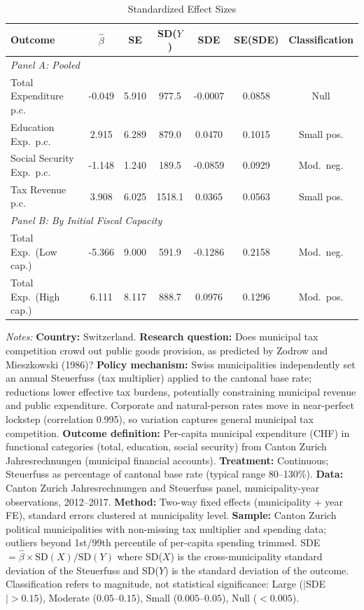 \begin{table}[htbp]
\centering
\caption{Standardized Effect Sizes}
\label{tab:sde}
\begin{tabular}{lcccccc}
\hline\hline
Outcome & $\hat{\beta}$ & SE & SD($Y$) & SDE & SE(SDE) & Classification \\
\hline
\multicolumn{7}{l}{\textit{Panel A: Pooled}} \\
Total Expenditure p.c. & -0.049 & 5.910 & 977.5 & -0.0007 & 0.0858 & Null \\
Education Exp.\ p.c. & 2.915 & 6.289 & 879.0 & 0.0470 & 0.1015 & Small pos. \\
Social Security Exp.\ p.c. & -1.148 & 1.240 & 189.5 & -0.0859 & 0.0929 & Mod.\ neg. \\
Tax Revenue p.c. & 3.908 & 6.025 & 1518.1 & 0.0365 & 0.0563 & Small pos. \\
\hline
\multicolumn{7}{l}{\textit{Panel B: By Initial Fiscal Capacity}} \\
Total Exp.\ (Low cap.) & -5.366 & 9.000 & 591.9 & -0.1286 & 0.2158 & Mod.\ neg. \\
Total Exp.\ (High cap.) & 6.111 & 8.117 & 888.7 & 0.0976 & 0.1296 & Mod.\ pos. \\
\hline\hline
\end{tabular}
\begin{tablenotes}\small
\item \textit{Notes:} \textbf{Country:} Switzerland. \textbf{Research question:} Does municipal tax competition crowd out public goods provision, as predicted by Zodrow and Mieszkowski (1986)? \textbf{Policy mechanism:} Swiss municipalities independently set an annual Steuerfuss (tax multiplier) applied to the cantonal base rate; reductions lower effective tax burdens, potentially constraining municipal revenue and public expenditure. Corporate and natural-person rates move in near-perfect lockstep (correlation 0.995), so variation captures general municipal tax competition. \textbf{Outcome definition:} Per-capita municipal expenditure (CHF) in functional categories (total, education, social security) from Canton Zurich Jahresrechnungen (municipal financial accounts). \textbf{Treatment:} Continuous; Steuerfuss as percentage of cantonal base rate (typical range 80--130\%). \textbf{Data:} Canton Zurich Jahresrechnungen and Steuerfuss panel, municipality-year observations, 2012--2017. \textbf{Method:} Two-way fixed effects (municipality + year FE), standard errors clustered at municipality level. \textbf{Sample:} Canton Zurich political municipalities with non-missing tax multiplier and spending data; outliers beyond 1st/99th percentile of per-capita spending trimmed. SDE $= \hat{\beta} \times \text{SD}(X) / \text{SD}(Y)$ where SD($X$) is the cross-municipality standard deviation of the Steuerfuss and SD($Y$) is the standard deviation of the outcome. Classification refers to magnitude, not statistical significance: Large ($|$SDE$| > 0.15$), Moderate ($0.05$--$0.15$), Small ($0.005$--$0.05$), Null ($< 0.005$). 
\end{tablenotes}
\end{table}
